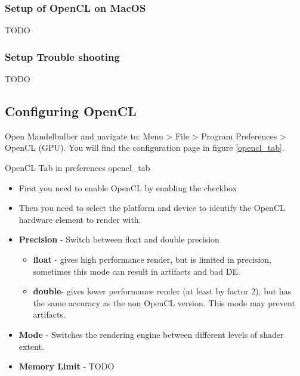 \subsubsection{Setup of OpenCL on MacOS}\label{setup-opencl-macos}
TODO

\subsubsection{Setup Trouble shooting}\label{setup-opencl-troubleshooting}
TODO

\subsection{Configuring OpenCL}\label{configure-opencl}
Open Mandelbulber and navigate to: Menu > File > Program Preferences > OpenCL (GPU).
You will find the configuration page in figure \ref{opencl_tab}.

{OpenCL Tab in preferences}
{opencl_tab}

\begin{itemize}
	\item First you need to enable OpenCL by enabling the checkbox
	\item Then you need to select the platform and device to identify the OpenCL hardware 
		element to render with.
	\item \textbf{Precision} - Switch between float and double precision
	\begin{itemize}
		\item \textbf{float} - gives high performance render, but is limited in precision, 
			sometimes this mode can result in artifacts and bad DE.
		\item \textbf{double}- gives lower performance render (at least by factor 2), but has the same accuracy as the non OpenCL version. This mode may prevent artifacts.
	\end{itemize}
	\item \textbf{Mode} - Switches the rendering engine between different levels of shader extent.	
	\item \textbf{Memory Limit} - TODO
\end{itemize}
